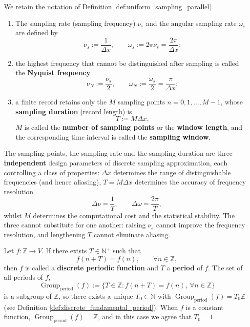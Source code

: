 \begin{definition}\label{def:nyquist_sampling_parallel}
We retain the notation of Definition \ref{def:uniform_sampling_parallel}.
\begin{enumerate}[label=(\roman*)]
    \item The sampling rate (sampling frequency) $\nu_s$ and the angular sampling rate $\omega_s$ are defined by
    \[
    \nu_s:=\frac{1}{\Delta x},\qquad \omega_s:=2\pi\nu_s=\frac{2\pi}{\Delta x};
    \]
    \item the highest frequency that cannot be distinguished after sampling is called the \textbf{Nyquist frequency}
    \[
    \nu_N:=\frac{\nu_s}{2},\qquad \omega_N:=\frac{\omega_s}{2}=\frac{\pi}{\Delta x};
    \]
    \item a finite record retains only the $M$ sampling points $n=0,1,\dots,M-1$, whose \textbf{sampling duration} (record length) is
    \[
    T:=M\Delta x,
    \]
    $M$ is called the \textbf{number of sampling points} or the \textbf{window length}, and the corresponding time interval is called the \textbf{sampling window}.
\end{enumerate}
\end{definition}

\begin{remark}\label{rem:sampling_three_parameters}
The sampling points, the sampling rate and the sampling duration are three \textbf{independent} design parameters of discrete sampling approximation, each controlling a class of properties: $\Delta x$ determines the range of distinguishable frequencies (and hence aliasing), $T=M\Delta x$ determines the accuracy of frequency resolution
\[
\Delta\nu=\frac{1}{T},\qquad \Delta\omega=\frac{2\pi}{T},
\]
whilst $M$ determines the computational cost and the statistical stability. The three cannot substitute for one another: raising $\nu_s$ cannot improve the frequency resolution, and lengthening $T$ cannot eliminate aliasing.
\end{remark}

\begin{definition}\label{def:discrete_periodic_function}
Let $f:\mathbb{Z}\to V$. If there exists $T\in\mathbb{N}^+$ such that
\[
f(n+T)=f(n),\qquad \forall n\in\mathbb{Z},
\]
then $f$ is called a \textbf{discrete periodic function} and $T$ a \textbf{period} of $f$. The set of all periods of $f$,
\[
\operatorname{Group}_{\mathrm{period}}(f):=\{T\in\mathbb{Z}:f(n+T)=f(n),\ \forall n\in\mathbb{Z}\}
\]
is a subgroup of $\mathbb{Z}$, so there exists a unique $T_0\in\mathbb{N}$ with $\operatorname{Group}_{\mathrm{period}}(f)=T_0\mathbb{Z}$ (see Definition \ref{def:discrete_fundamental_period}). When $f$ is a constant function, $\operatorname{Group}_{\mathrm{period}}(f)=\mathbb{Z}$, and in this case we agree that $T_0=1$.
\end{definition}

